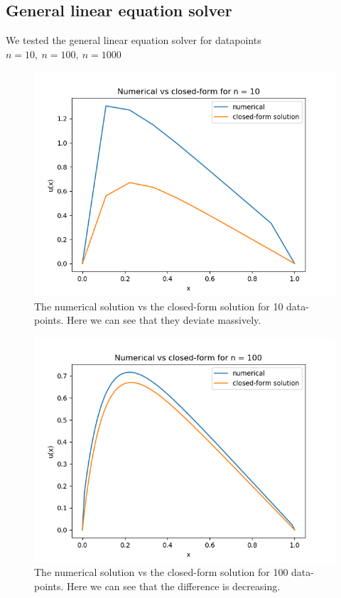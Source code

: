 \documentclass[a4paper,12pt,norsk]{article}
\begin{document}
	\subsection{General linear equation solver}
	We tested the general linear equation solver for datapoints $n = 10,\ n= 100,\ n=1000$
	\begin{figure}[H]
		\includegraphics[scale = 0.7]{Figures/Figure_1.png}
		\centering
		\caption{The numerical solution vs the closed-form solution for 10 data-points. Here we can see that they deviate massively.}
	\end{figure}

	\begin{figure}[H]
		\includegraphics[scale = 0.7]{Figures/Figure_2.png}
		\centering
		\caption{The numerical solution vs the closed-form solution for 100 data-points. Here we can see that the difference is decreasing.}
	\end{figure}
\end{document}
